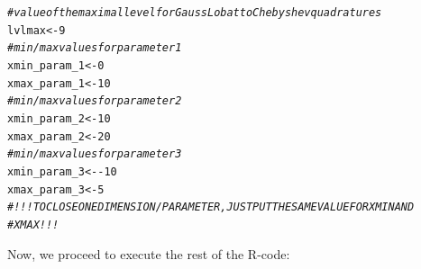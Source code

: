 \documentclass[times,12pt,3p]{article}\usepackage[]{graphicx}\usepackage[]{color}
\makeatletter
\newcommand{\hlnum}[1]{\textcolor[rgb]{0.686,0.059,0.569}{#1}}%
\newcommand{\hlcom}[1]{\textcolor[rgb]{0.678,0.584,0.686}{\textit{#1}}}%
\newcommand{\hlopt}[1]{\textcolor[rgb]{0,0,0}{#1}}%
\newcommand{\hlstd}[1]{\textcolor[rgb]{0.345,0.345,0.345}{#1}}%
\newcommand{\hlkwb}[1]{\textcolor[rgb]{0.69,0.353,0.396}{#1}}%
\newenvironment{kframe}{%
 \def\at@end@of@kframe{}%
 \ifinner\ifhmode%
  \def\at@end@of@kframe{\end{minipage}}%
  \begin{minipage}{\columnwidth}%
 \fi\fi%
 \def\FrameCommand##1{\hskip\@totalleftmargin \hskip-\fboxsep
 \colorbox{shadecolor}{##1}\hskip-\fboxsep
     \hskip-\linewidth \hskip-\@totalleftmargin \hskip\columnwidth}%
 \MakeFramed {\advance\hsize-\width
   \@totalleftmargin\z@ \linewidth\hsize
   \@setminipage}}%
 {\par\unskip\endMakeFramed%
 \at@end@of@kframe}
\newenvironment{knitrout}{}{} %
\makeatother
\begin{document}
\begin{knitrout}
\color{fgcolor}\begin{kframe}
\begin{alltt}
\hlcom{#value of the maximal level for Gauss Lobatto Chebyshev quadratures}
\hlstd{lvlmax} \hlkwb{<-} \hlnum{9}
\hlcom{#min/max values for parameter 1 }
\hlstd{xmin_param_1} \hlkwb{<-} \hlnum{0}
\hlstd{xmax_param_1} \hlkwb{<-} \hlnum{10}
\hlcom{#min/max values for parameter 2}
\hlstd{xmin_param_2} \hlkwb{<-} \hlnum{10}
\hlstd{xmax_param_2} \hlkwb{<-}\hlnum{20}
\hlcom{#min/max values for parameter 3}
\hlstd{xmin_param_3} \hlkwb{<-} \hlopt{-}\hlnum{10}
\hlstd{xmax_param_3} \hlkwb{<-} \hlnum{5}
\hlcom{# !!! TO CLOSE ONE DIMENSION/PARAMETER, JUST PUT THE SAME VALUE FOR XMIN AND}
\hlcom{#XMAX !!!}
\end{alltt}
\end{kframe}
\end{knitrout}

Now, we proceed to execute the rest of the R-code:
\end{document}
